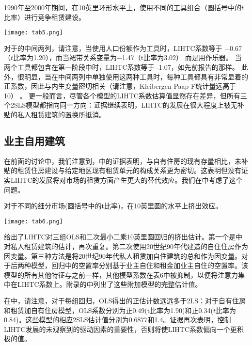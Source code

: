 \documentclass[lang=cn,11pt,a4paper]{paper}
\begin{document}
\begin{table}[h]
  \caption{1990年至2000年期间，在10英里环形水平上，使用不同的工具组合（圆括号中的$t$比率）进行竞争租赁建设。}\label{tab5}
  \texttt{[image: tab5.png]}
\noindent{}
\end{table}

对于的中间两列，请注意，当使用人口份额作为工具时，LIHTC系数等于 −0.67（$t$比率为1.20），而当裙带关系变量为−1.47（t比率为3.02） 而是用作乐器。 当两个工具都包含在第一阶段中时，LIHTC系数等于 -1.07，如先前报告的那样。 此外，很明显，当在中间两列中单独使用这两种工具时，每种工具都具有非常显着的正系数，因此与内生变量密切相关（请注意，Kleibergen-Paap F统计量远高于10） 。 更一般而言，尽管各个模型的LIHTC系数估算值显然存在差异，但所有三个2SLS模型都指向同一方向：证据继续表明，LIHTC的发展在很大程度上被无补贴的私人租赁建筑的置换所抵消。

\subsection{业主自用建筑}

在前面的讨论中，我们注意到，中的证据表明，与自有住房的现有存量相比，未补贴的租赁住房建设与给定地区现有租赁单元的构成关系更为密切。这表明但没有证实LIHTC的发展将对市场的租赁方面产生更大的替代效应。我们在中考虑了这个问题。

\begin{table}[h]
  \caption{对于不同的细分市场(圆括号中的t比率)，在10英里圆的水平上挤出效应。}\label{tab6}
  \texttt{[image: tab6.png]}
\noindent{}
\end{table}

给出了LIHTC对三组OLS和二次最小二乘10英里圆回归的挤出估计。第一个是中对私人租赁建筑的估计，再次重复。第二次使用20世纪90年代建造的自住住房作为因变量。第三种方法是将20世纪90年代私人租赁加自住建筑的总和作为因变量。对于后两种模型，回归中的空置率分别基于业主自住和租金加业主自住的空置率。该模型的所有其他特征与之前一样，其他模型系数在表6中被抑制，以便将注意力集中在LIHTC系数上。附录的中列出了这些附加模型的完整估计值。

在中，请注意，对于每组回归，OLS得出的正估计数远远多于2LS：对于自有住房和租赁加自有住房模型，OLS系数分别为正0.49(t比率为1.90)和正0.34($t$比率为0.84)。这些模型的相应2SLS估计值分别为0.6877和1.4。证据再次表明，控制LIHTC发展的未观察到的驱动因素的重要性，否则将使LIHTC系数偏向一个更积极的值。
\end{document}
